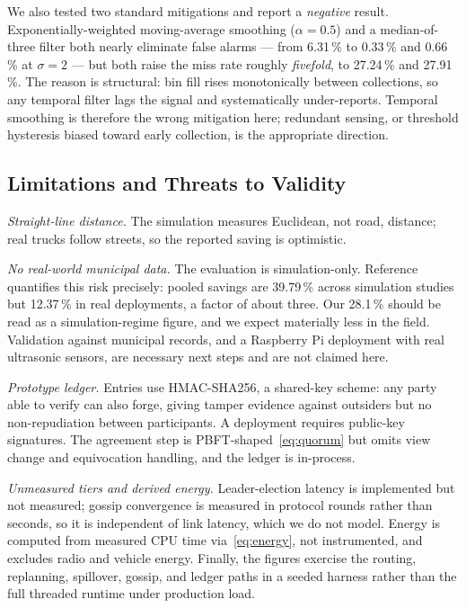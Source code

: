 \documentclass{llncs}
\begin{document}
We also tested two standard mitigations and report a \emph{negative} result.
Exponentially-weighted moving-average smoothing ($\alpha=0.5$) and a
median-of-three filter both nearly eliminate false alarms --- from 6.31\,\% to
0.33\,\% and 0.66\,\% at $\sigma=2$ --- but both raise the miss rate roughly
\emph{fivefold}, to 27.24\,\% and 27.91\,\%. The reason is structural: bin fill
rises monotonically between collections, so any temporal filter lags the signal
and systematically under-reports. Temporal smoothing is therefore the wrong
mitigation here; redundant sensing, or threshold hysteresis biased toward early
collection, is the appropriate direction.

\subsection{Limitations and Threats to Validity}
\label{sec:limits}
\emph{Straight-line distance.} The simulation measures Euclidean, not road,
distance; real trucks follow streets, so the reported saving is optimistic.

\emph{No real-world municipal data.} The evaluation is simulation-only.
Reference~\cite{maciel} quantifies this risk precisely: pooled savings are
39.79\,\% across simulation studies but 12.37\,\% in real deployments, a factor
of about three. Our 28.1\,\% should be read as a simulation-regime figure, and
we expect materially less in the field. Validation against municipal records,
and a Raspberry Pi deployment with real ultrasonic sensors, are necessary next
steps and are not claimed here.

\emph{Prototype ledger.} Entries use HMAC-SHA256, a shared-key scheme: any
party able to verify can also forge, giving tamper evidence against outsiders
but no non-repudiation between participants. A deployment requires public-key
signatures. The agreement step is PBFT-shaped~\eqref{eq:quorum} but omits view
change and equivocation handling, and the ledger is in-process.

\emph{Unmeasured tiers and derived energy.} Leader-election latency is
implemented but not measured; gossip convergence is measured in protocol rounds
rather than seconds, so it is independent of link latency, which we do not
model. Energy is computed from measured CPU time via~\eqref{eq:energy}, not
instrumented, and excludes radio and vehicle energy. Finally, the figures
exercise the routing, replanning, spillover, gossip, and ledger paths in a
seeded harness rather than the full threaded runtime under production load.
\end{document}
